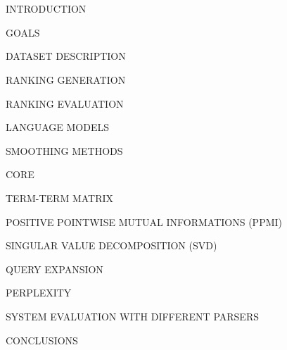 \section{}

\begin{frame}{INTRODUCTION}
    
\end{frame}

\begin{frame}{GOALS}
    
\end{frame}

\begin{frame}{DATASET DESCRIPTION}
    
\end{frame}

\begin{frame}{RANKING GENERATION}
    
\end{frame}

\begin{frame}{RANKING EVALUATION}
    
\end{frame}

\begin{frame}{LANGUAGE MODELS}
    
\end{frame}

\begin{frame}{SMOOTHING METHODS}
    
\end{frame}

\begin{frame}{CORE}
    
\end{frame}

\begin{frame}{TERM-TERM MATRIX}
    
\end{frame}

\begin{frame}{POSITIVE POINTWISE MUTUAL INFORMATIONS (PPMI)}
    
\end{frame}

\begin{frame}{SINGULAR VALUE DECOMPOSITION (SVD)}
    
\end{frame}

\begin{frame}{QUERY EXPANSION}
    
\end{frame}

\begin{frame}{PERPLEXITY}
    
\end{frame}

\begin{frame}{SYSTEM EVALUATION WITH DIFFERENT PARSERS}
    
\end{frame}

\begin{frame}{CONCLUSIONS}
    
\end{frame}







